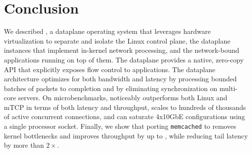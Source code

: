 
\section{Conclusion}

We described \ix, a dataplane operating system that leverages hardware
virtualization to separate and isolate the Linux control plane, the
\ix dataplane instances that implement in-kernel network processing,
and the network-bound applications running on top of them.  The \ix
dataplane provides a native, zero-copy API that explicitly exposes
flow control to applications. The dataplane architecture optimizes for
both bandwidth and latency by processing bounded batches of packets to
completion and by eliminating synchronization on multi-core
servers. On microbenchmarks, \ix noticeably outperforms both Linux and
mTCP in terms of both latency and throughput, scales to hundreds of
thousands of active concurrent connections, and can saturate 4x10GbE
configurations using a single processor socket.  Finally, we show that
porting \texttt{memcached} to \ix removes kernel bottlenecks and
improves throughput by up to \usrspeedup, while reducing tail latency
by more than $2\times$.


